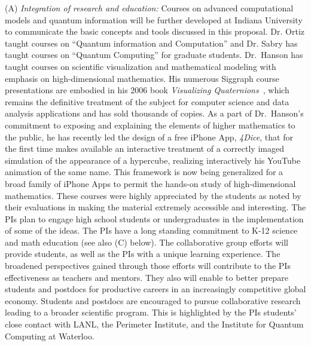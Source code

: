 \documentclass{article}
\theoremstyle{remark}
\begin{document}
\noindent (A) {\em Integration of research and education:} Courses on
advanced computational models and quantum information will be further
developed at Indiana University to communicate the basic concepts and
tools discussed in this proposal. Dr. Ortiz taught courses on
``Quantum information and Computation'' and Dr. Sabry has taught
courses on ``Quantum Computing'' for graduate students.  Dr.\ Hanson
has taught courses on scientific visualization and mathematical
modeling with emphasis on high-dimensional mathematics.  His numerous
Siggraph course presentations are embodied in his 2006 book {\it
  Visualizing Quaternions\/}~\cite{Hanson2006}, 
which remains the definitive treatment
of the subject for computer science and data analysis applications and
has sold thousands of copies. As a part of Dr.\ Hanson's commitment to
exposing and explaining the elements of higher mathematics to the
public, he has recently led the design of a free iPhone App, {\it
  4Dice\/}, that for the first time makes available an interactive
treatment of a correctly imaged simulation of the appearance of a
hypercube, realizing interactively his YouTube animation of the same
name.  This framework is now being generalized for a broad family of
iPhone Apps to permit the hands-on study of high-dimensional
mathematics.  These courses were highly appreciated by the students as
noted by their evaluations in making the material extremely accessible
and interesting.  The PIs plan to engage high school students or
undergraduates in the implementation of some of the ideas.  The PIs
have a long standing commitment to K-12 science and math education
(see also (C) below). The collaborative group efforts will provide
students, as well as the PIs with a unique learning experience. The
broadened perspectives gained through those efforts will contribute to
the PIs effectiveness as teachers and mentors. They also will enable
to better prepare students and postdocs for productive careers in an
increasingly competitive global economy. Students and postdocs are
encouraged to pursue collaborative research leading to a broader
scientific program. This is highlighted by the PIs students' close
contact with LANL, the Perimeter Institute, and the Institute for
Quantum Computing at Waterloo.
\end{document}
